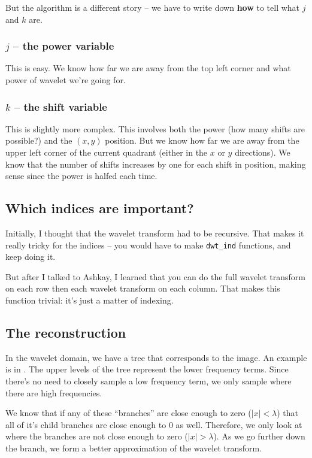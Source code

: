 \documentclass[leqno]{article}
\begin{document}
        But the algorithm is a different story -- we have to write down \textbf{how} to tell what $j$ and $k$ are.

        \subsubsection{$j$ -- the power variable}
            This is easy. We know how far we are away from the top left corner and what power of wavelet we're going for.

        \subsubsection{$k$ -- the shift variable}
            This is slightly more complex. This involves both the power (how many shifts are possible?) and the $(x,y)$ position. But we know how far we are away from the upper left corner of the current quadrant (either in the $x$ or $y$ directions). We know that the number of shifts increases by one for each shift in position, making sense since the power is halfed each time.



        \subsection{Which indices are important?}
            Initially, I thought that the wavelet transform had to be recursive. That makes it really tricky for the indices -- you would have to make \texttt{dwt\_ind} functions, and keep doing it. 

            But after I talked to Ashkay, I learned that you can do the full wavelet transform on each row then each wavelet transform on each column. That makes this function trivial: it's just a matter of indexing. 

        \subsection{The reconstruction}
            In the wavelet domain, we have a tree that corresponds to the image. An example is in . The upper levels of the tree represent the lower frequency terms. Since there's no need to closely sample a low frequency term, we only sample where there are high frequencies. 

            We know that if any of these ``branches'' are close enough to zero ($|x| < \lambda$) that all of it's child branches are close enough to 0 as well. Therefore, we only look at where the branches are not close enough to zero ($|x| > \lambda$). As we go further down the branch, we form a better approximation of the wavelet transform.
            
\end{document}
